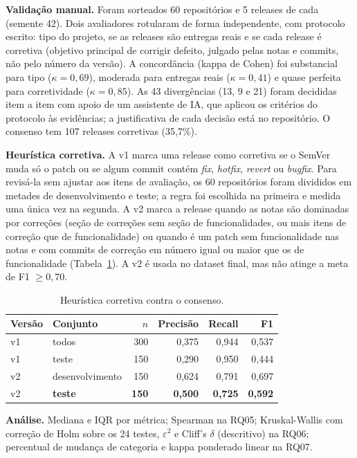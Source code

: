 \documentclass[12pt]{article}
\begin{document}
\textbf{Validação manual.} Foram sorteados 60 repositórios e 5 releases de
cada (semente 42). Dois avaliadores rotularam de forma independente, com
protocolo escrito: tipo do projeto, se as releases são entregas reais e se
cada release é corretiva (objetivo principal de corrigir defeito, julgado
pelas notas e commits, não pelo número da versão). A concordância (kappa de
Cohen) foi substancial para tipo ($\kappa=0{,}69$), moderada para entregas
reais ($\kappa=0{,}41$) e quase perfeita para corretividade
($\kappa=0{,}85$). As 43 divergências (13, 9 e 21) foram decididas
item a item com apoio de um assistente de IA, que aplicou os critérios do
protocolo às evidências; a justificativa de cada decisão está no
repositório. O consenso tem 107 releases corretivas (35,7\%).

\textbf{Heurística corretiva.} A v1 marca uma release como corretiva se o
SemVer muda só o patch ou se algum commit contém \emph{fix}, \emph{hotfix},
\emph{revert} ou \emph{bugfix}. Para revisá-la sem ajustar aos itens de
avaliação, os 60 repositórios foram divididos em metades de desenvolvimento e
teste; a regra foi escolhida na primeira e medida uma única vez na segunda.
A v2 marca a release quando as notas são dominadas por correções (seção de
correções sem seção de funcionalidades, ou mais itens de correção que de
funcionalidade) ou quando é um patch sem funcionalidade nas notas e com
commits de correção em número igual ou maior que os de funcionalidade
(Tabela~\ref{tab:heur}). A v2 é usada no dataset final, mas não atinge a
meta de F1 $\geq 0{,}70$.

\begin{table}[ht]
\centering
\caption{Heurística corretiva contra o consenso.}\label{tab:heur}
\small
\begin{tabular}{llrrrr}
\toprule
Versão & Conjunto & $n$ & Precisão & Recall & F1 \\
\midrule
v1 & todos & 300 & 0,375 & 0,944 & 0,537 \\
v1 & teste & 150 & 0,290 & 0,950 & 0,444 \\
v2 & desenvolvimento & 150 & 0,624 & 0,791 & 0,697 \\
v2 & \textbf{teste} & \textbf{150} & \textbf{0,500} & \textbf{0,725} & \textbf{0,592} \\
\bottomrule
\end{tabular}
\end{table}

\textbf{Análise.} Mediana e IQR por métrica; Spearman na RQ05;
Kruskal-Wallis com correção de Holm sobre os 24 testes, $\varepsilon^2$ e
Cliff's $\delta$ (descritivo) na RQ06; percentual de mudança de categoria e
kappa ponderado linear na RQ07.
\end{document}
